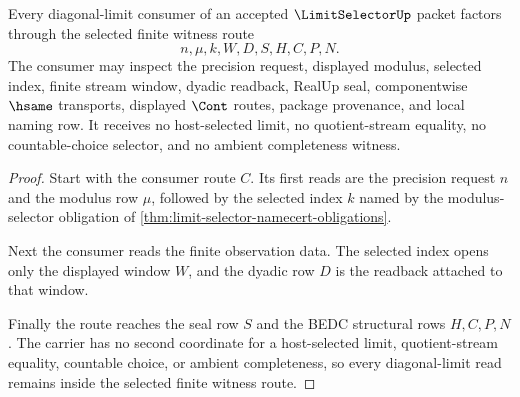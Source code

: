 \begin{theorem}
\label{thm:limit-selector-finite-witness-route}
Every diagonal-limit consumer of an accepted $\LimitSelectorUp$ packet factors through the selected finite witness route
$$
n,\mu,k,W,D,S,H,C,P,N.
$$
The consumer may inspect the precision request, displayed modulus, selected index, finite stream window, dyadic readback, RealUp seal, componentwise $\hsame$ transports, displayed $\Cont$ routes, package provenance, and local naming row. It receives no host-selected limit, no quotient-stream equality, no countable-choice selector, and no ambient completeness witness.
\end{theorem}
\begin{proof}
Start with the consumer route $C$. Its first reads are the precision request $n$ and the modulus row $\mu$, followed by the selected index $k$ named by the modulus-selector obligation of \autoref{thm:limit-selector-namecert-obligations}.

Next the consumer reads the finite observation data. The selected index opens only the displayed window $W$, and the dyadic row $D$ is the readback attached to that window.

Finally the route reaches the seal row $S$ and the BEDC structural rows $H,C,P,N$. The carrier has no second coordinate for a host-selected limit, quotient-stream equality, countable choice, or ambient completeness, so every diagonal-limit read remains inside the selected finite witness route.
\end{proof}

